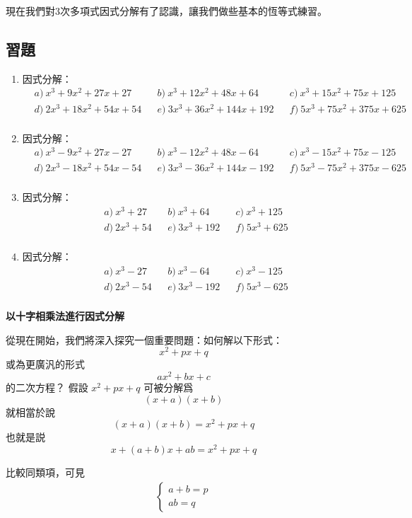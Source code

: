 \documentclass[12pt]{article}
\begin{document}
    現在我們對3次多項式因式分解有了認識，讓我們做些基本的恆等式練習。

    \subsection*{習題}
    \begin{enumerate}
        \item 因式分解：\begin{align*}
            &a)\ x^3+9x^2+27x+27&&b)\ x^3+12x^2+48x+64&&c)\ x^3+15x^2+75x+125\\
            &d)\ 2x^3+18x^2+54x+54&&e)\ 3x^3+36x^2+144x+192&&f)\ 5x^3+75x^2+375x+625\\
        \end{align*}
        \item 因式分解：\begin{align*}
            &a)\ x^3-9x^2+27x-27&&b)\ x^3-12x^2+48x-64&&c)\ x^3-15x^2+75x-125\\
            &d)\ 2x^3-18x^2+54x-54&&e)\ 3x^3-36x^2+144x-192&&f)\ 5x^3-75x^2+375x-625\\
        \end{align*}
        \item 因式分解：\begin{align*}
            &a)\ x^3+27&&b)\ x^3+64&&c)\ x^3+125\\
            &d)\ 2x^3+54&&e)\ 3x^3+192&&f)\ 5x^3+625\\
        \end{align*}
        \item 因式分解：\begin{align*}
            &a)\ x^3-27&&b)\ x^3-64&&c)\ x^3-125\\
            &d)\ 2x^3-54&&e)\ 3x^3-192&&f)\ 5x^3-625\\
        \end{align*}
    \end{enumerate}

    \begin{center}
        \textbf{以十字相乘法進行因式分解}
    \end{center}

    從現在開始，我們將深入探究一個重要問題：如何解以下形式： $$x^2+px+q$$ 或為更廣汎的形式 $$ax^2+bx+c$$ 的二次方程？ 假設 $x^2+px+q$ 可被分解爲 $$(x+a)(x+b)$$ 就相當於說 $$(x+a)(x+b)=x^2+px+q$$ 也就是説 $$x+(a+b)x+ab=x^2+px+q$$

    比較同類項，可見 \begin{align*}
        \begin{cases}
            a+b=p\\
            ab=q
        \end{cases}
    \end{align*}
\end{document}
